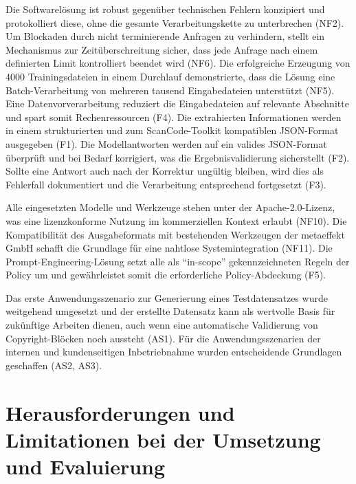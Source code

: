 Die Softwarelösung ist robust gegenüber technischen Fehlern konzipiert und protokolliert diese, ohne die gesamte Verarbeitungskette zu unterbrechen (NF2).
Um Blockaden durch nicht terminierende Anfragen zu verhindern, stellt ein Mechanismus zur Zeitüberschreitung sicher, dass jede Anfrage nach einem definierten Limit kontrolliert beendet wird (NF6).
Die erfolgreiche Erzeugung von \num{4000} Trainingsdateien in einem Durchlauf demonstrierte, dass die Lösung eine Batch-Verarbeitung von mehreren tausend Eingabedateien unterstützt (NF5).
Eine Datenvorverarbeitung reduziert die Eingabedateien auf relevante Abschnitte und spart somit Rechenressourcen (F4).
Die extrahierten Informationen werden in einem strukturierten und zum ScanCode-Toolkit kompatiblen JSON-Format ausgegeben (F1).
Die Modellantworten werden auf ein valides JSON-Format überprüft und bei Bedarf korrigiert, was die Ergebnisvalidierung sicherstellt (F2).
Sollte eine Antwort auch nach der Korrektur ungültig bleiben, wird dies als Fehlerfall dokumentiert und die Verarbeitung entsprechend fortgesetzt (F3).

Alle eingesetzten Modelle und Werkzeuge stehen unter der Apache-2.0-Lizenz, was eine lizenzkonforme Nutzung im kommerziellen Kontext erlaubt (NF10).
Die Kompatibilität des Ausgabeformats mit bestehenden Werkzeugen der metaeffekt GmbH schafft die Grundlage für eine nahtlose Systemintegration (NF11).
Die Prompt-Engineering-Lösung setzt alle als \enquote{in-scope} gekennzeichneten Regeln der Policy um und gewährleistet somit die erforderliche Policy-Abdeckung (F5).

Das erste Anwendungsszenario zur Generierung eines Testdatensatzes wurde weitgehend umgesetzt und der erstellte Datensatz kann als wertvolle Basis für zukünftige Arbeiten dienen, auch wenn eine automatische Validierung von Copyright-Blöcken noch aussteht (AS1).
Für die Anwendungsszenarien der internen und kundenseitigen Inbetriebnahme wurden entscheidende Grundlagen geschaffen (AS2, AS3).



\section{Herausforderungen und Limitationen bei der Umsetzung und Evaluierung}

